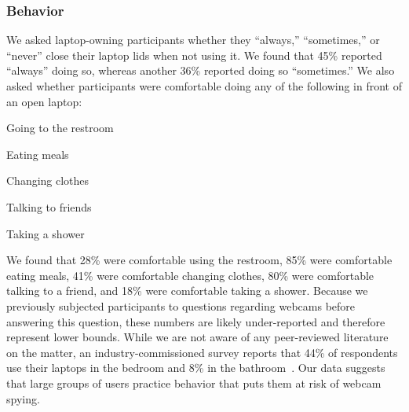 \documentclass{sigchi}
\newenvironment{packed_item}{
\begin{itemize}
  \setlength{\itemsep}{1pt}
  \setlength{\parskip}{0pt}
  \setlength{\parsep}{0pt}
}{\end{itemize}}
\begin{document}

\subsubsection{Behavior}

We asked laptop-owning participants whether they ``always,'' ``sometimes,'' or ``never'' close their laptop lids when not using it. We found that 45\% reported ``always'' doing so, whereas another 36\% reported doing so ``sometimes.'' We also asked whether participants were comfortable doing any of the following in front of an open laptop:

\begin{packed_item}
\item Going to the restroom
\item Eating meals
\item Changing clothes
\item Talking to friends
\item Taking a shower
\end{packed_item}

We found that 28\% were comfortable using the restroom, 85\% were comfortable eating meals, 41\% were comfortable changing clothes, 80\% were comfortable talking to a friend, and 18\% were comfortable taking a shower. Because we previously subjected participants to questions regarding webcams before answering this question, these numbers are likely under-reported and therefore represent lower bounds.
While we are not aware of any peer-reviewed literature on the matter, an industry-commissioned survey reports that 44\% of respondents use their laptops in the bedroom and 8\% in the bathroom~\cite{RouseSomeone}. Our data suggests that large groups of users practice behavior that puts them at risk of webcam spying.
\end{document}
